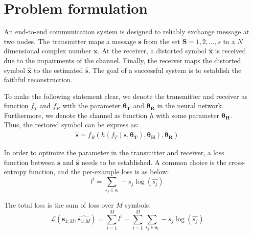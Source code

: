 \documentclass[12pt,a4paper]{article}
\begin{document}
	\section{Problem formulation}
	\noindent
	\par  An end-to-end communication system is designed to reliably exchange message at two nodes. The transmitter maps a message $\bm{s}$ from the set $\mathbf{S}={1,2,...,s}$ to a $N$ dimensional complex number $\bm{x}$. At the receiver, a distorted symbol $\hat{\bm{x}}$ is received due to the impairments of the channel. Finally, the receiver maps the distorted symbol $\hat{\bm{x}}$ to the estimated $\hat{\bm{s}}$. The goal of a successful system is to establish the faithful reconstruction.
	\par To make the following statement clear, we denote the transmitter and receiver as function $f_T$ and $f_R$ with the parameter $\bm{\theta_T}$ and $\bm{\theta_R}$ in the neural network. Furthermore, we denote the channel as function $h$ with some parameter $\bm{\theta_H}$. Thus, the restored symbol can be express as:
	\begin{equation}
		\begin{aligned}
			\hat{\bm{s}}=f_R(h(f_T(\bm{s},\bm{\theta_T}),\bm{\theta_H}),\bm{\theta_R})
		\end{aligned}
	\end{equation}
	\par In order to optimize the parameter in the transmitter and receiver, a loss function between $\bm{s}$ and $\hat{\bm{s}}$ needs to be established. A common choice is the cross-entropy function, and the per-example loss is as below:
	\begin{equation}
		l^{i}=\sum_{s_j\in\bm{s}_i}-s_j\log(\hat{s_j})
	\end{equation}
	\par The total loss is the sum of loss over $M$ symbols:
	\begin{equation} \label{loss}
		\mathcal{L}(\bm{s}_{1:M},\hat{\bm{s}_{1:M}})=\sum_{i=1}^{M}l^i=\sum_{i=1}^{M}\sum_{s_j\in\bm{s_i}}-s_j\log(\hat{s_j})
	\end{equation}
	
\end{document}
